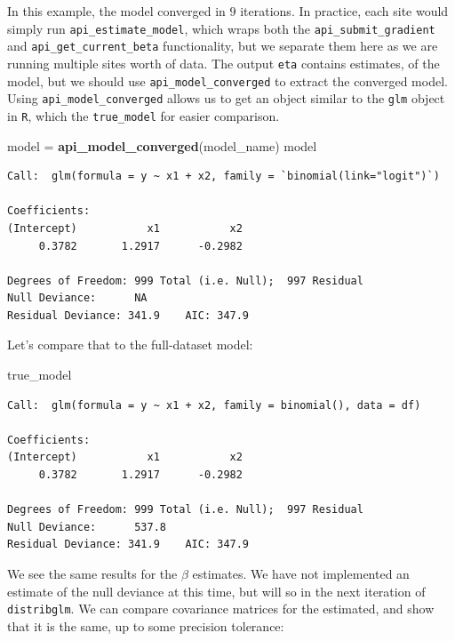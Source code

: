 \documentclass[]{elsarticle} %
\newenvironment{Shaded}{\begin{snugshade}}{\end{snugshade}}
\newcommand{\KeywordTok}[1]{\textcolor[rgb]{0.13,0.29,0.53}{\textbf{#1}}}
\newcommand{\NormalTok}[1]{#1}
\newcommand{\StringTok}[1]{\textcolor[rgb]{0.31,0.60,0.02}{#1}}
\begin{document}
In this example, the model converged in \(9\) iterations. In practice, each site would simply run \texttt{api\_estimate\_model}, which wraps both the \texttt{api\_submit\_gradient} and \texttt{api\_get\_current\_beta} functionality, but we separate them here as we are running multiple sites worth of data. The output \texttt{eta} contains estimates, of the model, but we should use \texttt{api\_model\_converged} to extract the converged model. Using \texttt{api\_model\_converged} allows us to get an object similar to the \texttt{glm} object in \texttt{R}, which the \texttt{true\_model} for easier comparison.

\begin{Shaded}
\begin{Highlighting}[]
\NormalTok{model =}\StringTok{ }\KeywordTok{api\_model\_converged}\NormalTok{(model\_name)}
\NormalTok{model}
\end{Highlighting}
\end{Shaded}

\begin{verbatim}
Call:  glm(formula = y ~ x1 + x2, family = `binomial(link="logit")`)

Coefficients:
(Intercept)           x1           x2  
     0.3782       1.2917      -0.2982  

Degrees of Freedom: 999 Total (i.e. Null);  997 Residual
Null Deviance:      NA 
Residual Deviance: 341.9    AIC: 347.9
\end{verbatim}

Let's compare that to the full-dataset model:

\begin{Shaded}
\begin{Highlighting}[]
\NormalTok{true\_model}
\end{Highlighting}
\end{Shaded}

\begin{verbatim}
Call:  glm(formula = y ~ x1 + x2, family = binomial(), data = df)

Coefficients:
(Intercept)           x1           x2  
     0.3782       1.2917      -0.2982  

Degrees of Freedom: 999 Total (i.e. Null);  997 Residual
Null Deviance:      537.8 
Residual Deviance: 341.9    AIC: 347.9
\end{verbatim}

We see the same results for the \(\beta\) estimates. We have not implemented an estimate of the null deviance at this time, but will so in the next iteration of \texttt{distribglm}. We can compare covariance matrices for the estimated, and show that it is the same, up to some precision tolerance:
\end{document}
